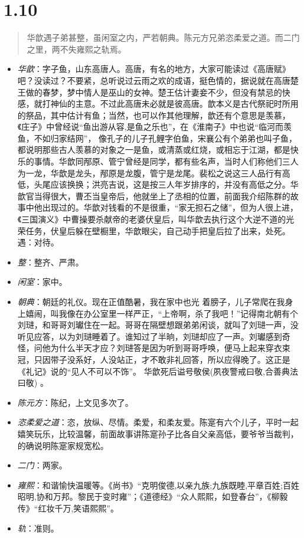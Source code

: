 \documentclass[]{book}
\providecommand{\tightlist}{%
  \setlength{\itemsep}{0pt}\setlength{\parskip}{0pt}}
\begin{document}
\section{1.10}\label{section-9}

\begin{quote}
华歆遇子弟甚整，虽闲室之内，严若朝典。陈元方兄弟恣柔爱之道。而二门之里，两不失雍熙之轨焉。
\end{quote}

\begin{itemize}
\tightlist
\item
  \emph{华歆}：字子鱼，山东高唐人。高唐，有名的地方，大家可能读过《高唐赋》吧？没读过？不要紧，总听说过云雨之欢的成语，挺色情的，据说就在高唐楚王做的春梦，梦中情人是巫山的女神。楚王估计妻妾不少，但没有禁忌的快感，就打神仙的主意。不过此高唐未必就是彼高唐。歆本义是古代祭祀时所用的祭品，其中估计有鱼；当然，也可以作其他理解，歆还有个意思是羡慕，《庄子》中曾经说``鱼出游从容,是鱼之乐也''，在《淮南子》中也说``临河而羡鱼，不如归家结网''，
  像孔子的儿子孔鲤字伯鱼，宋襄公有个弟弟也叫子鱼，都说明那些古人羡慕的对象之一是鱼，或清蒸或红烧，或相忘于江湖，都是快乐的事情。华歆同邴原、管宁曾经是同学，都有些名声，当时人们称他们三人为一龙，华歆是龙头，邴原是龙腹，管宁是龙尾。裴松之说这三人品行有高低，头尾应该换换；洪亮吉说，这是按三人年岁排序的，并没有高低之分。华歆官当得很大，曹丕当皇帝后，他就坐上了丞相的位置，前面我介绍陈群的故事中他出现过的。华歆对钱看的不是很重，``家无担石之储''，但为人很上进，《三国演义》中曹操要杀献帝的老婆伏皇后，叫华歆去执行这个大逆不道的光荣任务，伏皇后躲在壁橱里，华歆眼尖，自己动手把皇后拉了出来，处死。
  遇：对待。
\item
  \emph{整}：整齐、严肃。
\item
  \emph{闲室}：家中。
\item
  \emph{朝典}：朝廷的礼仪。现在正值酷暑，我在家中也光
  着膀子，儿子常爬在我身上嬉闹，叫我像在办公室里一样严正，``上帝啊，杀了我吧！''记得南北朝有个刘琎，和哥哥刘瓛住在一起。哥哥在隔壁想跟弟弟闲谈，就叫了刘琎一声，没听见应答，以为刘琎睡着了。谁知过了半晌，刘琎却应了一声。刘瓛感到奇怪，问他为什么半天才应？刘琎答是因为听到哥哥呼唤，便马上起来穿衣束冠，只因带子没系好，人没站正，才不敢非礼回答，所以应得晚了。这正是《礼记》说的``见人不可以不饰''。
  华歆死后谥号敬侯(夙夜警戒曰敬,合善典法曰敬) 。
\item
  \emph{陈元方}：陈纪，上文见多次了。
\item
  \emph{恣柔爱之道}：恣，放纵、尽情。柔爱，和柔友爱。陈寔有六个儿子，平时一起嬉笑玩乐，比较温馨，前面故事讲陈寔孙子比各自父亲高低，要爷爷当裁判，的确说明陈寔家规宽松。
\item
  \emph{二门}：两家。
\item
  \emph{雍熙}：和谐愉快温暖等。《尚书》``克明俊德,以亲九族;九族既睦,平章百姓;百姓昭明,协和万邦。黎民于变时雍''；《道德经》``众人熙熙，如登春台''，《柳毅传》``红妆千万,笑语熙熙''。
\item
  \emph{轨}：准则。
\end{itemize}
\end{document}
